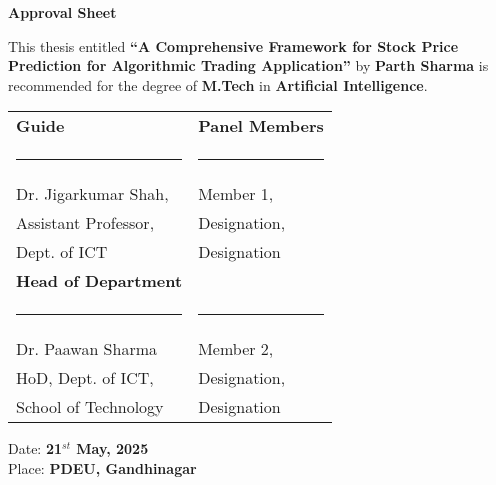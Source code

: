 \begin{center}
\textbf{\large Approval Sheet}
\end{center}

This thesis entitled \textbf{\enquote{A Comprehensive Framework for Stock Price Prediction for Algorithmic Trading Application}} by \textbf{Parth Sharma} is recommended for the degree of \textbf{M.Tech} in \textbf{Artificial Intelligence}.

\vspace{1cm}

\begin{table}[h!]
\centering
\begin{tabular}{@{}m{}<{\centering} m{}<{\centering}@{}}
\textbf{Guide} & \textbf{Panel Members} \\[4em]
\rule{0.4\textwidth}{0.4pt} & \rule{0.4\textwidth}{0.4pt} \\[1em]
Dr. Jigarkumar Shah, & Member 1, \\[1em]
Assistant Professor, &  Designation, \\[1em]
Dept. of ICT &  Designation \\[2em]
\textbf{Head of Department} & \\ [4em]
\rule{0.4\textwidth}{0.4pt} & \rule{0.4\textwidth}{0.4pt} \\[1em]
Dr. Paawan Sharma & Member 2, \\[1em]
HoD, Dept. of ICT, & Designation,\\[1em]
School of Technology & Designation\\[1em]
\end{tabular}
\end{table}

\vfill
\begin{flushleft}
    Date: \textbf{21$^{st}$ May, 2025}\\
    Place: \textbf{PDEU, Gandhinagar}\\    
\end{flushleft}